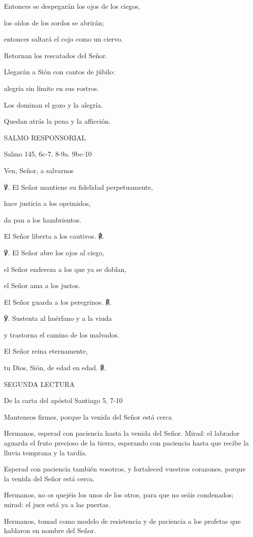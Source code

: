 \documentclass[]{article}
\begin{document}
Entonces se despegarán los ojos de los ciegos,

los oídos de los sordos se abrirán;

entonces saltará el cojo como un ciervo.

Retornan los rescatados del Señor.

Llegarán a Sión con cantos de júbilo:

alegría sin límite en sus rostros.

Los dominan el gozo y la alegría.

Quedan atrás la pena y la aflicción.

SALMO RESPONSORIAL

Salmo 145, 6c-7. 8-9a. 9bc-10

Ven, Señor, a salvarnos

℣. El Señor mantiene su fidelidad perpetuamente,

hace justicia a los oprimidos,

da pan a los hambrientos.

El Señor liberta a los cautivos. ℟.

℣. El Señor abre los ojos al ciego,

el Señor endereza a los que ya se doblan,

el Señor ama a los justos.

El Señor guarda a los peregrinos. ℟.

℣. Sustenta al huérfano y a la viuda

y trastorna el camino de los malvados.

El Señor reina eternamente,

tu Dios, Sión, de edad en edad. ℟.

SEGUNDA LECTURA

De la carta del apóstol Santiago 5, 7-10

Manteneos firmes, porque la venida del Señor está cerca

Hermanos, esperad con paciencia hasta la venida del Señor. Mirad: el
labrador aguarda el fruto precioso de la tierra, esperando con paciencia
hasta que recibe la lluvia temprana y la tardía.

Esperad con paciencia también vosotros, y fortaleced vuestros corazones,
porque la venida del Señor está cerca.

Hermanos, no os quejéis los unos de los otros, para que no seáis
condenados; mirad: el juez está ya a las puertas.

Hermanos, tomad como modelo de resistencia y de paciencia a los profetas
que hablaron en nombre del Señor.
\end{document}
